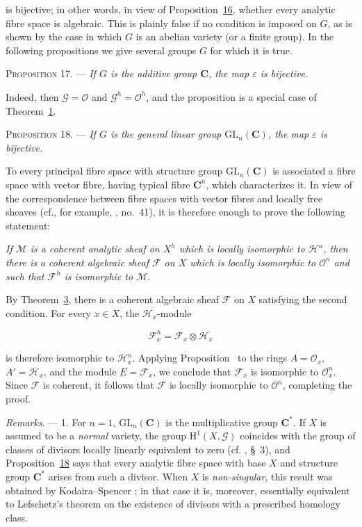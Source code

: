 is bijective; in other words, in view of Proposition~\hyperref[gaga:prop:16]{16},
whether every analytic fibre space is algebraic. This is plainly false if no
condition is imposed on $G$, as is shown by the case in which $G$ is an
abelian variety (or a finite group). In the following propositions we give
several groups $G$ for which it is true.

\textsc{Proposition 17}. --- \emph{If $G$ is the
additive group $\mathbf{C}$, the map $\varepsilon$ is bijective.}

Indeed, then $\mathcal{G}=\mathcal{O}$ and
$\mathcal{G}^h=\mathcal{O}^h$, and the proposition is a special case of
Theorem~\hyperref[gaga:thm:1]{1}.

\textsc{Proposition 18}. --- \emph{If $G$ is the
general linear group $\mathrm{GL}_n(\mathbf{C})$, the map $\varepsilon$ is
bijective.}

To every principal fibre space with structure group
$\mathrm{GL}_n(\mathbf{C})$ is associated a fibre space with vector fibre,
having typical fibre $\mathbf{C}^n$, which characterizes it. In view of the
correspondence between fibre spaces with vector fibres and locally free
sheaves (cf., for example, , no.~41), it is therefore enough to prove the
following statement:

\emph{If $\mathcal{M}$ is a coherent analytic sheaf on $X^h$ which is locally
isomorphic to $\mathcal{H}^n$, then there is a coherent algebraic sheaf
$\mathcal{F}$ on $X$ which is locally isomorphic to $\mathcal{O}^n$ and such
that $\mathcal{F}^h$ is isomorphic to $\mathcal{M}$.}

By Theorem~\hyperref[gaga:thm:3]{3}, there is a coherent algebraic sheaf
$\mathcal{F}$ on $X$ satisfying the second condition. For every $x\in X$, the
$\mathcal{H}_x$-module

\begin{equation*}
\mathcal{F}^h_x=\mathcal{F}_x\otimes\mathcal{H}_x
\end{equation*}

is therefore isomorphic to $\mathcal{H}_x^n$. Applying 
Proposition~ to the rings $A=\mathcal{O}_x$, $A'=\mathcal{H}_x$, and the
module $E=\mathcal{F}_x$, we conclude that $\mathcal{F}_x$ is isomorphic to
$\mathcal{O}_x^n$. Since $\mathcal{F}$ is coherent, it follows that
$\mathcal{F}$ is locally isomorphic to $\mathcal{O}^n$, completing the proof.

\emph{Remarks}. --- 1. For $n=1$,
$\mathrm{GL}_n(\mathbf{C})$ is the multiplicative group $\mathbf{C}^*$. If
$X$ is assumed to be a \emph{normal} variety, the group
$\mathrm{H}^1(X,\mathcal{G})$ coincides with the group of classes of divisors
locally linearly equivalent to zero (cf. , \S~3), and
Proposition~\hyperref[gaga:prop:18]{18} says that every analytic fibre space
with base $X$ and structure group $\mathbf{C}^*$ arises from such a divisor.
When $X$ is \emph{non-singular}, this result was obtained by
Kodaira--Spencer ; in that case it is, moreover, essentially equivalent
to Lefschetz's theorem on the existence of divisors with a prescribed
homology class.


